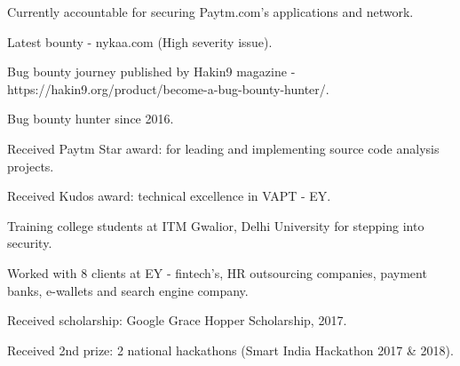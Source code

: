 
\cvsubsection{}

  \begin{cvitems} %
    \item {Currently accountable for securing Paytm.com's applications and network.}
    \item {Latest bounty - nykaa.com (High severity issue).}
    \item {Bug bounty journey published by Hakin9 magazine - https://hakin9.org/product/become-a-bug-bounty-hunter/.}
    \item {Bug bounty hunter since 2016.}
    \item {Received Paytm Star award: for leading and implementing source code analysis projects.}
    \item {Received Kudos award: technical excellence in VAPT - EY.}
    \item {Training college students at ITM Gwalior, Delhi University for stepping into security.}
    \item {Worked with 8 clients at EY - fintech’s, HR outsourcing companies, payment banks, e-wallets and search engine company.}
    \item {Received scholarship: Google Grace Hopper Scholarship, 2017.}
    \item {Received 2nd prize: 2 national hackathons (Smart India Hackathon 2017 \& 2018).}

  \end{cvitems}
